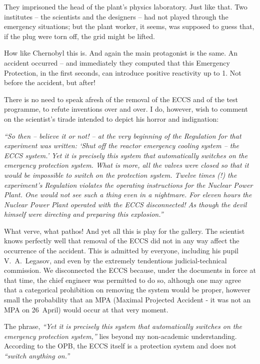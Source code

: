 \documentclass[openright]{bookest}
\begin{document}
They imprisoned the head of the plant's physics laboratory. Just like that. Two institutes -- the scientists and the designers -- had not played through the emergency situations; but the plant worker, it seems, was supposed to guess that, if the plug were torn off, the grid might be lifted.

How like Chernobyl this is. And again the main protagonist is the same. An accident occurred -- and immediately they computed that this Emergency Protection, in the first seconds, can introduce positive reactivity up to \qty{1}{\beta}. Not before the accident, but after!

There is no need to speak afresh of the removal of the ECCS and of the test programme, to refute inventions over and over. I do, however, wish to comment on the scientist's tirade intended to depict his horror and indignation:


\begin{personal}
\textit{``So then -- believe it or not! -- at the very beginning of the Regulation for that experiment was written: `Shut off the reactor emergency cooling system -- the ECCS system.' Yet it is precisely this system that automatically switches on the emergency protection system. What is more, all the valves were closed so that it would be impossible to switch on the protection system. Twelve times (!) the experiment's Regulation violates the operating instructions for the Nuclear Power Plant. One would not see such a thing even in a nightmare. For eleven hours the Nuclear Power Plant operated with the ECCS disconnected! As though the devil himself were directing and preparing this explosion.''}
\end{personal}

What verve, what pathos! And yet all this is play for the gallery. The scientist knows perfectly well that removal of the ECCS did not in any way affect the occurrence of the accident. This is admitted by everyone, including his pupil V.~A.~Legasov, and even by the extremely tendentious judicial-technical commission. We disconnected the ECCS because, under the documents in force at that time, the chief engineer was permitted to do so, although one may agree that a categorical prohibition on removing the system would be proper, however small the probability that an MPA (Maximal Projected Accident - it was not an MPA on 26~April) would occur at that very moment.

The phrase, \textit{``Yet it is precisely this system that automatically switches on the emergency protection system,''} lies beyond my non-academic understanding. According to the OPB, the ECCS itself is a protection system and does not \textit{``switch anything on.''}
\end{document}

